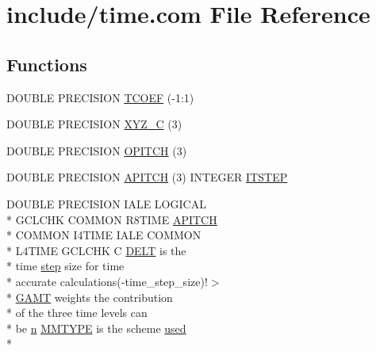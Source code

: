 \hypertarget{time_8com}{\section{include/time.com File Reference}
\label{time_8com}
}
\subsection*{Functions}
\begin{DoxyCompactItemize}
\item 
D\-O\-U\-B\-L\-E P\-R\-E\-C\-I\-S\-I\-O\-N \hyperlink{time_8com_aad879029f2fa532de16a429259050a96}{T\-C\-O\-E\-F} (-\/1\-:1)
\item 
D\-O\-U\-B\-L\-E P\-R\-E\-C\-I\-S\-I\-O\-N \hyperlink{time_8com_a111feccb47294f894c15abd62185ec74}{X\-Y\-Z\-\_\-\-C} (3)
\item 
D\-O\-U\-B\-L\-E P\-R\-E\-C\-I\-S\-I\-O\-N \hyperlink{time_8com_a817db4f87447cb3cd3ab4338d1f67ea6}{O\-P\-I\-T\-C\-H} (3)
\item 
D\-O\-U\-B\-L\-E P\-R\-E\-C\-I\-S\-I\-O\-N \hyperlink{time_8com_a45717e5c9ccf2afd6bb9e4efe67c74e6}{A\-P\-I\-T\-C\-H} (3) I\-N\-T\-E\-G\-E\-R \hyperlink{time_8com_a786e3f66d928497c6f34694ad75543f4}{I\-T\-S\-T\-E\-P}
\item 
D\-O\-U\-B\-L\-E P\-R\-E\-C\-I\-S\-I\-O\-N I\-A\-L\-E L\-O\-G\-I\-C\-A\-L \\*
G\-C\-L\-C\-H\-K C\-O\-M\-M\-O\-N R8\-T\-I\-M\-E \hyperlink{time_8com_a45717e5c9ccf2afd6bb9e4efe67c74e6}{A\-P\-I\-T\-C\-H} \\*
C\-O\-M\-M\-O\-N I4\-T\-I\-M\-E I\-A\-L\-E C\-O\-M\-M\-O\-N \\*
L4\-T\-I\-M\-E G\-C\-L\-C\-H\-K C \hyperlink{time_8com_a5513a2d02244417f197860f9d142b7a4}{D\-E\-L\-T} is the \\*
time \hyperlink{time_8com_a91e550adb29e949f38f0252aa68aceed}{step} size for time \\*
accurate calculations(-\/time\-\_\-step\-\_\-size)!$>$\\*
 \hyperlink{time_8com_afdf546d0ac261dc8969599f6c2786ea3}{G\-A\-M\-T} weights the contribution \\*
of the three time levels can \\*
be \hyperlink{time_8com_a59787df2891338b611ba3a1096154aa3}{n} \hyperlink{time_8com_a7cab4e82cd8529facf6a2802f81887ff}{M\-M\-T\-Y\-P\-E} is the scheme \hyperlink{streamplasma_8com_ae33ecc71599b4338146f31d68e60c328}{used} \\*

\end{DoxyCompactItemize}

